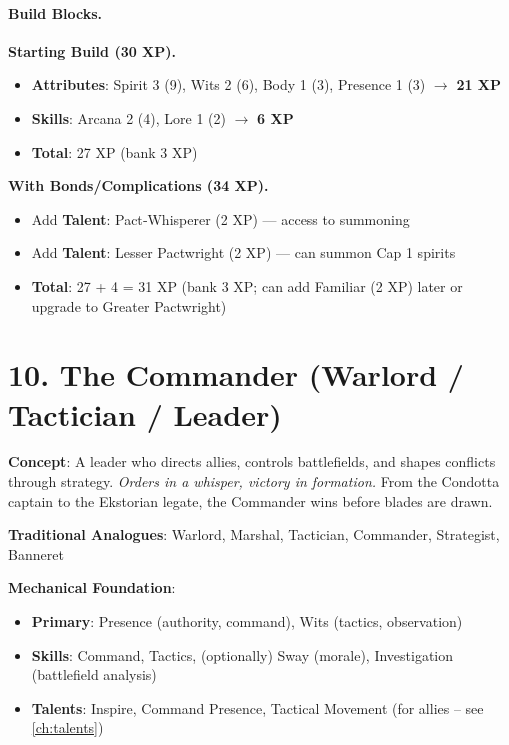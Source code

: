 \paragraph{Build Blocks.}
\textbf{Starting Build (30 XP).}
\begin{itemize}
\item \textbf{Attributes}: Spirit 3 (9), Wits 2 (6), Body 1 (3), Presence 1 (3) $\rightarrow$ \textbf{21 XP}
\item \textbf{Skills}: Arcana 2 (4), Lore 1 (2) $\rightarrow$ \textbf{6 XP}
\item \textbf{Total}: 27 XP (bank 3 XP)
\end{itemize}
\textbf{With Bonds/Complications (34 XP).}
\begin{itemize}
\item Add \textbf{Talent}: Pact‑Whisperer (2 XP) — access to summoning
\item Add \textbf{Talent}: Lesser Pactwright (2 XP) — can summon Cap 1 spirits
\item \textbf{Total}: 27 + 4 = 31 XP (bank 3 XP; can add Familiar (2 XP) later or upgrade to Greater Pactwright)
\end{itemize}

\section{10. The Commander (Warlord / Tactician / Leader)}
\label{sec:concept-commander}

\textbf{Concept}: A leader who directs allies, controls battlefields, and shapes conflicts through strategy. \emph{Orders in a whisper, victory in formation.} From the Condotta captain to the Ekstorian legate, the Commander wins before blades are drawn.

\textbf{Traditional Analogues}: Warlord, Marshal, Tactician, Commander, Strategist, Banneret

\textbf{Mechanical Foundation}:
\begin{itemize}
\item \textbf{Primary}: Presence (authority, command), Wits (tactics, observation)
\item \textbf{Skills}: Command, Tactics, (optionally) Sway (morale), Investigation (battlefield analysis)
\item \textbf{Talents}: Inspire, Command Presence, Tactical Movement (for allies – see \ref{ch:talents})
\end{itemize}

